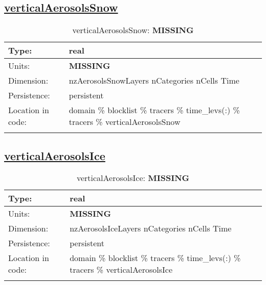 \subsection[verticalAerosolsSnow]{\hyperref[sec:var_tab_tracers]{verticalAerosolsSnow}}
\label{subsec:var_sec_tracers_verticalAerosolsSnow}
\begin{center}
\begin{longtable}{| p{2.0in} | p{4.0in} |}
        \hline 
        Type: & real \\
        \hline 
        Units: & {\bf \color{red} MISSING} \\
        \hline 
        Dimension: & nzAerosolsSnowLayers nCategories nCells Time \\
        \hline 
        Persistence: & persistent \\
        \hline 
         Location in code: & domain \% blocklist \% tracers \% time\_levs(:) \% tracers \% verticalAerosolsSnow \\
         \hline 
    \caption{verticalAerosolsSnow: {\bf \color{red} MISSING}}
\end{longtable}
\end{center}
\subsection[verticalAerosolsIce]{\hyperref[sec:var_tab_tracers]{verticalAerosolsIce}}
\label{subsec:var_sec_tracers_verticalAerosolsIce}
\begin{center}
\begin{longtable}{| p{2.0in} | p{4.0in} |}
        \hline 
        Type: & real \\
        \hline 
        Units: & {\bf \color{red} MISSING} \\
        \hline 
        Dimension: & nzAerosolsIceLayers nCategories nCells Time \\
        \hline 
        Persistence: & persistent \\
        \hline 
         Location in code: & domain \% blocklist \% tracers \% time\_levs(:) \% tracers \% verticalAerosolsIce \\
         \hline 
    \caption{verticalAerosolsIce: {\bf \color{red} MISSING}}
\end{longtable}
\end{center}
